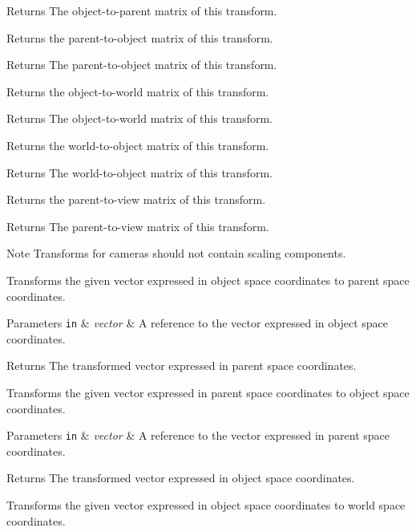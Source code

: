 \begin{DoxyReturn}{Returns}
The object-\/to-\/parent matrix of this transform.
\end{DoxyReturn}
Returns the parent-\/to-\/object matrix of this transform.

\begin{DoxyReturn}{Returns}
The parent-\/to-\/object matrix of this transform.
\end{DoxyReturn}
Returns the object-\/to-\/world matrix of this transform.

\begin{DoxyReturn}{Returns}
The object-\/to-\/world matrix of this transform.
\end{DoxyReturn}
Returns the world-\/to-\/object matrix of this transform.

\begin{DoxyReturn}{Returns}
The world-\/to-\/object matrix of this transform.
\end{DoxyReturn}
Returns the parent-\/to-\/view matrix of this transform.

\begin{DoxyReturn}{Returns}
The parent-\/to-\/view matrix of this transform. 
\end{DoxyReturn}
\begin{DoxyNote}{Note}
Transforms for cameras should not contain scaling components.
\end{DoxyNote}
Transforms the given vector expressed in object space coordinates to parent space coordinates.


\begin{DoxyParams}[1]{Parameters}
\mbox{\tt in}  & {\em vector} & A reference to the vector expressed in object space coordinates. \\
\hline
\end{DoxyParams}
\begin{DoxyReturn}{Returns}
The transformed vector expressed in parent space coordinates.
\end{DoxyReturn}
Transforms the given vector expressed in parent space coordinates to object space coordinates.


\begin{DoxyParams}[1]{Parameters}
\mbox{\tt in}  & {\em vector} & A reference to the vector expressed in parent space coordinates. \\
\hline
\end{DoxyParams}
\begin{DoxyReturn}{Returns}
The transformed vector expressed in object space coordinates.
\end{DoxyReturn}
Transforms the given vector expressed in object space coordinates to world space coordinates.


